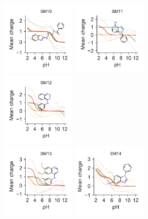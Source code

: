 \documentclass[9pt,lineno,final]{elife}
\begin{document}
	
\begin{figure}[H]	
	\centering
	\includegraphics[width=0.33\textwidth]{Reports/SM10-titrationcurve-views.pdf}
	\includegraphics[width=0.33\textwidth]{Reports/SM11-titrationcurve-views.pdf}
	\includegraphics[width=0.33\textwidth]{Reports/SM12-titrationcurve-views.pdf}	 \\
	\includegraphics[width=0.33\textwidth]{Reports/SM13-titrationcurve-views.pdf}
	\includegraphics[width=0.33\textwidth]{Reports/SM14-titrationcurve-views.pdf}

\end{figure}
\end{document}
